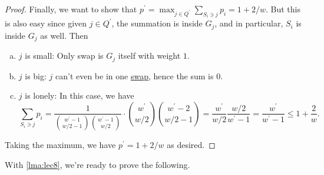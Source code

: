 \begin{proof}
	Finally, we want to show that \(p^\prime = \max _{j\in Q^\prime }\sum_{S_i \ni j}p_i = 1 + 2 / w \). But this is also easy since given \(j\in Q^\prime \), the summation is inside \(G_j\), and in particular, \(S_i\) is inside \(G_j\) as well. Then
	\begin{enumerate}[(a)]
		\item \(j\) is small: Only swap is \(G_j\) itself with weight \(1\).
		\item \(j\) is big: \(j\) can't even be in one \hyperref[not:swap]{swap}, hence the sum is \(0\).
		\item \(j\) is lonely: In this case, we have
		      \[
			      \sum_{S_i \ni j} p_i = \frac{1}{\binom{w^\prime - 1}{w / 2 - 1} \binom{w^\prime - 1}{w / 2}}\cdot \binom{w^\prime }{w / 2}\binom{w^\prime -2}{w / 2 - 1} = \frac{w^\prime }{w / 2} \frac{w/2}{w^\prime -1} = \frac{w^\prime }{w^\prime -1} \leq 1 + \frac{2}{w}.
		      \]
	\end{enumerate}
	Taking the maximum, we have \(p^\prime = 1 + 2 / w\) as desired.
\end{proof}

With \autoref{lma:lec8}, we're ready to prove the following.

